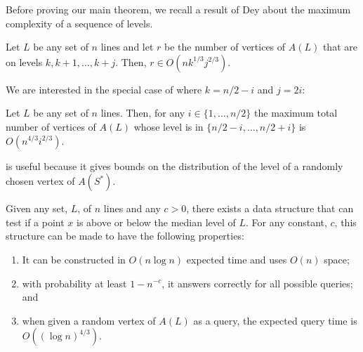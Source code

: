 \documentclass{cccg12}
\begin{document}
Before proving our main theorem, we recall a result of Dey
\cite[Theorem~4.2]{d98} about the maximum complexity of a sequence
of levels.

\begin{lem}
 Let $L$ be any set of $n$ lines and let $r$ be the number of vertices
 of $A(L)$ that are on levels $k,k+1,\ldots,k+j$.  Then, $r \in
 O(nk^{1/3}j^{2/3})$.
\end{lem}

We are interested in the special case of  where $k=n/2-i$
and $j=2i$:

\begin{cor}
  Let $L$ be any set of $n$ lines.  Then, for any $i\in\{1,\ldots,n/2\}$
  the maximum total number of vertices of $A(L)$ whose level is in
  $\{n/2-i,\ldots,n/2+i\}$ is $O(n^{4/3}i^{2/3})$.
\end{cor}

 is useful because it gives bounds on the distribution of
the level of a randomly chosen vertex of $A(S^*)$.

\begin{thm}
  Given any set, $L$, of $n$ lines and any $c>0$, there exists a data
  structure that can test if a point $x$ is above or below the median
  level of $L$.  For any constant, $c$, this structure can be made to
  have the following properties:
  \begin{enumerate}\setlength{\itemsep}{0mm}
    \item It can be constructed in
       $O(n\log n)$ expected time and uses $O(n)$ space;
    \item with probability
       at least $1-n^{-c}$, it answers correctly for all
       possible queries; and
    \item when given a random vertex of $A(L)$
       as a query, the expected query time is $O((\log n)^{4/3})$.
  \end{enumerate}
\end{thm}
\end{document}
